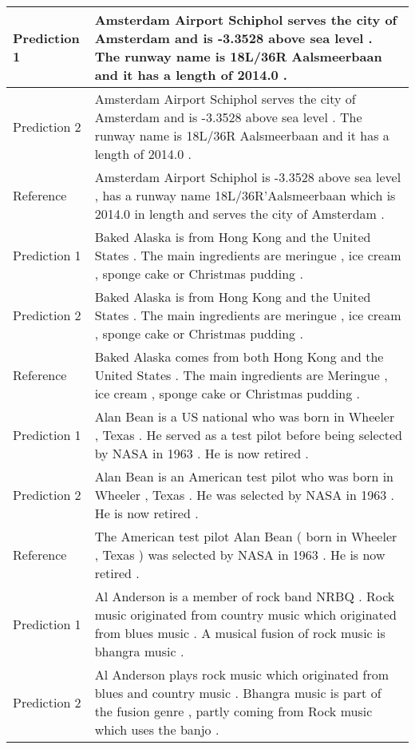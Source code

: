 \documentclass[11pt]{article}
\begin{document}
\begin{table*}[]
\centering
\begin{tabular}{l|p{13cm}}
\midrule[2pt]
Prediction 1 & Amsterdam Airport Schiphol serves the city of Amsterdam and is -3.3528 above sea level . The runway name is 18L/36R Aalsmeerbaan and it has a length of 2014.0 .              \\ \hline 
Prediction 2 & Amsterdam Airport Schiphol serves the city of Amsterdam and is -3.3528 above sea level . The runway name is 18L/36R Aalsmeerbaan and it has a length of 2014.0 .              \\ \hline
Reference     & Amsterdam Airport Schiphol is -3.3528 above sea level , has a runway name 18L/36R’Aalsmeerbaan which is 2014.0 in length and serves the city of Amsterdam .                   \\ \midrule[2pt]
Prediction 1 & Baked Alaska is from Hong Kong and the United States . The main ingredients are meringue , ice cream , sponge cake or Christmas pudding .                                     \\ \hline
Prediction 2 & Baked Alaska is from Hong Kong and the United States . The main ingredients are meringue , ice cream , sponge cake or Christmas pudding .                                     \\ \hline
Reference     & Baked Alaska comes from both Hong Kong and the United States . The main ingredients are Meringue , ice cream , sponge cake or Christmas pudding .                             \\ \midrule[2pt]
Prediction 1 & Alan Bean is a US national who was born in Wheeler , Texas . He served as a test pilot before being selected by NASA in 1963 . He is now retired .                            \\ \hline
Prediction 2 & Alan Bean is an American test pilot who was born in Wheeler , Texas . He was selected by NASA in 1963 . He is now retired .                                                   \\ \hline
Reference     & The American test pilot Alan Bean ( born in Wheeler , Texas ) was selected by NASA in 1963 . He is now retired .                                                              \\ \midrule[2pt]
Prediction 1 & Al Anderson is a member of rock band NRBQ . Rock music originated from country music which originated from blues music . A musical fusion of rock music is bhangra music .    \\ \hline
Prediction 2 & Al Anderson plays rock music which originated from blues and country music . Bhangra music is part of the fusion genre , partly coming from Rock music which uses the banjo . \\ \hline

\end{tabular}
\end{table*}
\end{document}
